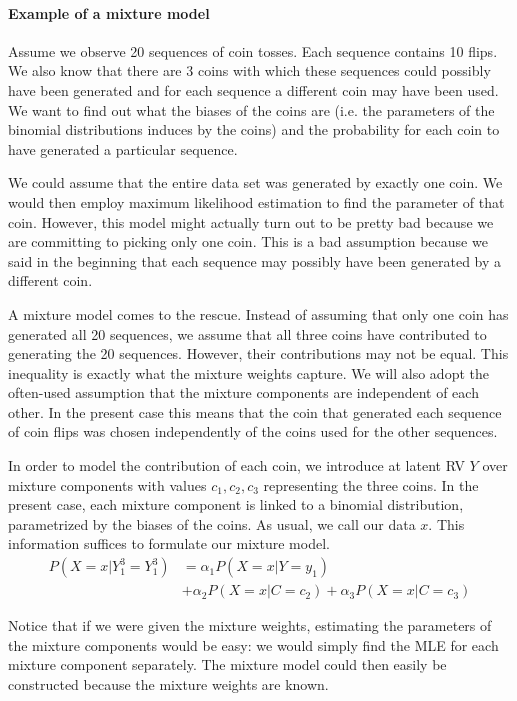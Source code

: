 \paragraph{Example of a mixture model} Assume we observe 20 sequences of coin tosses. Each sequence
contains 10 flips. We also know that there are 3 coins with which these sequences could possibly have been
generated and for each sequence a different coin may have been used. We want to find out what the biases
of the coins are (i.e. the parameters of the binomial distributions induces by the coins) and the probability
for each coin to have generated a particular sequence.
 
We could assume that the entire data set was generated by exactly one coin. We would then employ maximum likelihood estimation 
to find the parameter of that coin. However, this model might actually turn out to be
pretty bad because we are committing to picking only one coin. This is a bad assumption because we said in the beginning that
each sequence may possibly have been generated by a different coin. 

A mixture model comes to the rescue. Instead of assuming that only one coin has generated all 20 sequences,
we assume that all three coins have contributed to generating the 20 sequences. However, their contributions
may not be equal. This inequality is exactly what the mixture weights capture. We will also adopt the often-used assumption
that the mixture components are independent of each other. In the present case this means that the coin that generated each
sequence of coin flips was chosen independently of the coins used for the other sequences.

In order to model the contribution of each coin, we introduce at latent RV $ Y $ over mixture components with values $ c_{1}, c_{2}, c_{3} $ representing the three coins.
In the present case, each mixture component is linked to a binomial distribution, parametrized by the biases of
the coins. As usual, we call our data $ x $. This information suffices to formulate our mixture model.
\begin{align} 
P(X=x|Y_{1}^{3}=Y_{1}^{3}) 
&= \alpha_{1}P(X=x|Y=y_{1}) \label{eq:mixtureExample} \\
&+ \alpha_{2}P(X=x|C=c_{2}) + \alpha_{3}P(X=x|C=c_{3}) \nonumber
\end{align}

Notice that if we were given the mixture weights, estimating
the parameters of the mixture components would be easy: we would simply find the MLE for each mixture component separately. The mixture
model could then easily be constructed because the mixture weights are known. 

